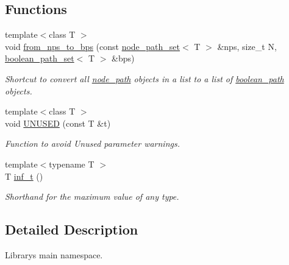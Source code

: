 \subsection*{Functions}
\begin{DoxyCompactItemize}
\item 
{\footnotesize template$<$class T $>$ }\\void \hyperlink{namespacelgraph_a22faf23dc44c909b5727c26625637447}{from\+\_\+nps\+\_\+to\+\_\+bps} (const \hyperlink{namespacelgraph_a0570ce57129123d5816913d287f6cc73}{node\+\_\+path\+\_\+set}$<$ T $>$ \&nps, size\+\_\+t N, \hyperlink{namespacelgraph_afad432931ba600ab1628d5c9595986c5}{boolean\+\_\+path\+\_\+set}$<$ T $>$ \&bps)
\begin{DoxyCompactList}\small\item\em Shortcut to convert all \hyperlink{classlgraph_1_1node__path}{node\+\_\+path} objects in a list to a list of \hyperlink{classlgraph_1_1boolean__path}{boolean\+\_\+path} objects. \end{DoxyCompactList}\item 
\mbox{\label{namespacelgraph_a9c17e678f030dbd9da486735489e5aef}} 
{\footnotesize template$<$class T $>$ }\\void \hyperlink{namespacelgraph_a9c17e678f030dbd9da486735489e5aef}{U\+N\+U\+S\+ED} (const T \&t)
\begin{DoxyCompactList}\small\item\em Function to avoid \textquotesingle{}Unused parameter\textquotesingle{} warnings. \end{DoxyCompactList}\item 
\mbox{\label{namespacelgraph_af736a008e890d631c62cc8c719e966a2}} 
{\footnotesize template$<$typename T $>$ }\\T \hyperlink{namespacelgraph_af736a008e890d631c62cc8c719e966a2}{inf\+\_\+t} ()
\begin{DoxyCompactList}\small\item\em Shorthand for the maximum value of any type. \end{DoxyCompactList}\end{DoxyCompactItemize}


\subsection{Detailed Description}
Library\textquotesingle{}s main namespace. 


